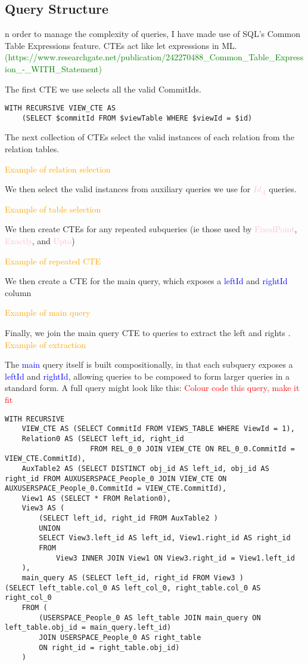 \documentclass[12pt,a4paper,twoside,openright]{report}
\newcommand\todo[1]{\textcolor{red}{#1}}
\newcommand\codeName[1]{\textcolor{blue}{#1}}
\newcommand\toReference[1]{\textcolor{green}{#1}}
\newcommand\diagramNeeded[1]{\textcolor{orange}{#1}}
\newcommand\mathName[1]{\textcolor{pink}{#1}}
\begin{document}
{{	\subsection{Query Structure}
	n order to manage the complexity of queries, I have made use of SQL’s Common Table Expressions feature. CTEs act like let expressions in ML. \toReference{(https://www.researchgate.net/publication/242270488_Common_Table_Expression_-_WITH_Statement)}

	The first CTE we use selects all the valid CommitIds.
\begin{framed}
	\begin{verbatim}
WITH RECURSIVE VIEW_CTE AS 
	(SELECT $commitId FROM $viewTable WHERE $viewId = $id)
	\end{verbatim}
\end{framed}

The next collection of CTEs select the valid instances of each relation from the relation tables.

\diagramNeeded{Example of relation selection}

We then select the valid instances from auxiliary queries we use for \mathName{$Id_A$} queries.

\diagramNeeded{Example of table selection}

We then create CTEs for any repeated subqueries (ie those used by \mathName{FixedPoint}, \mathName{Exactly}, and \mathName{Upto})

\diagramNeeded{Example of repeated CTE}

We then create a CTE for the main query, which exposes a \codeName{leftId} and \codeName{rightId}  column

\diagramNeeded{Example of main query}

Finally, we join the main query CTE to queries to extract the left and rights .
\diagramNeeded{Example of extraction}

The \codeName{main} query itself is built compositionally, in that each subquery exposes a \codeName{leftId} and \codeName{rightId},  allowing queries to be composed to form larger queries in a standard form. A full query might look like this:
	\todo{Colour code this query, make it fit}
\begin{framed}
\begin{verbatim}
WITH RECURSIVE
	VIEW_CTE AS (SELECT CommitId FROM VIEWS_TABLE WHERE ViewId = 1),
	Relation0 AS (SELECT left_id, right_id 
					FROM REL_0_0 JOIN VIEW_CTE ON REL_0_0.CommitId = VIEW_CTE.CommitId),
	AuxTable2 AS (SELECT DISTINCT obj_id AS left_id, obj_id AS right_id FROM AUXUSERSPACE_People_0 JOIN VIEW_CTE ON AUXUSERSPACE_People_0.CommitId = VIEW_CTE.CommitId),
	View1 AS (SELECT * FROM Relation0),
	View3 AS (
		(SELECT left_id, right_id FROM AuxTable2 )
		UNION
		SELECT View3.left_id AS left_id, View1.right_id AS right_id
		FROM
			View3 INNER JOIN View1 ON View3.right_id = View1.left_id
	),
	main_query AS (SELECT left_id, right_id FROM View3 )
(SELECT left_table.col_0 AS left_col_0, right_table.col_0 AS right_col_0
	FROM (
		(USERSPACE_People_0 AS left_table JOIN main_query ON left_table.obj_id = main_query.left_id)
		JOIN USERSPACE_People_0 AS right_table
		ON right_id = right_table.obj_id)
	)


\end{verbatim}
\end{framed}}}
\end{document}
